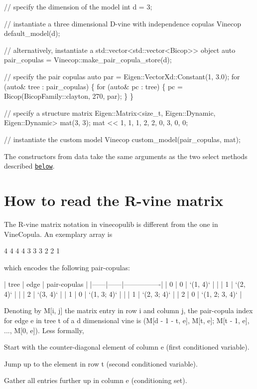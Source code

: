 \begin{DoxyCode}
\textcolor{comment}{// specify the dimension of the model}
\textcolor{keywordtype}{int} d = 3;

\textcolor{comment}{// instantiate a three dimensional D-vine with independence copulas}
Vinecop default\_model(d);

\textcolor{comment}{// alternatively, instantiate a std::vector<std::vector<Bicop>> object}
\textcolor{keyword}{auto} pair\_copulas = Vinecop::make\_pair\_copula\_store(d);

\textcolor{comment}{// specify the pair copulas}
\textcolor{keyword}{auto} par = Eigen::VectorXd::Constant(1, 3.0);
\textcolor{keywordflow}{for} (\textcolor{keyword}{auto}& tree : pair\_copulas) \{
       \textcolor{keywordflow}{for} (\textcolor{keyword}{auto}& pc : tree) \{
           pc = Bicop(BicopFamily::clayton, 270, par);
       \}
\}

\textcolor{comment}{// specify a structure matrix}
Eigen::Matrix<size\_t, Eigen::Dynamic, Eigen::Dynamic> mat(3, 3);
mat << 1, 1, 1,
          2, 2, 0,
          3, 0, 0;

\textcolor{comment}{// instantiate the custom model}
Vinecop custom\_model(pair\_copulas, mat);
\end{DoxyCode}
 The constructors from data take the same arguments as the two select methods described \href{#vinecop-fit}{\tt below}.\hypertarget{overview-vinecop_vinecop-matrix}{}\section{How to read the R-\/vine matrix}\label{overview-vinecop_vinecop-matrix}
The R-\/vine matrix notation in vinecopulib is different from the one in Vine\+Copula. An exemplary array is 
\begin{DoxyCode}
4 4 4 4
3 3 3
2 2
1
\end{DoxyCode}
 which encodes the following pair-\/copulas\+: 
\begin{DoxyCode}
| tree | edge | pair-copulas   |
|------|------|----------------|
| 0    | 0    | `(1, 4)`       |
|      | 1    | `(2, 4)`       |
|      | 2    | `(3, 4)`       |
| 1    | 0    | `(1, 3; 4)`    |
|      | 1    | `(2, 3; 4)`    |
| 2    | 0    | `(1, 2; 3, 4)` |
\end{DoxyCode}
 Denoting by {\ttfamily M\mbox{[}i, j\mbox{]}} the matrix entry in row {\ttfamily i} and column {\ttfamily j}, the pair-\/copula index for edge {\ttfamily e} in tree {\ttfamily t} of a {\ttfamily d} dimensional vine is {\ttfamily (M\mbox{[}d -\/ 1 -\/ t, e\mbox{]}, M\mbox{[}t, e\mbox{]}; M\mbox{[}t -\/ 1, e\mbox{]}, ..., M\mbox{[}0, e\mbox{]})}. Less formally,
\begin{DoxyEnumerate}
\item Start with the counter-\/diagonal element of column {\ttfamily e} (first conditioned variable).
\item Jump up to the element in row {\ttfamily t} (second conditioned variable).
\item Gather all entries further up in column {\ttfamily e} (conditioning set).
\end{DoxyEnumerate}

